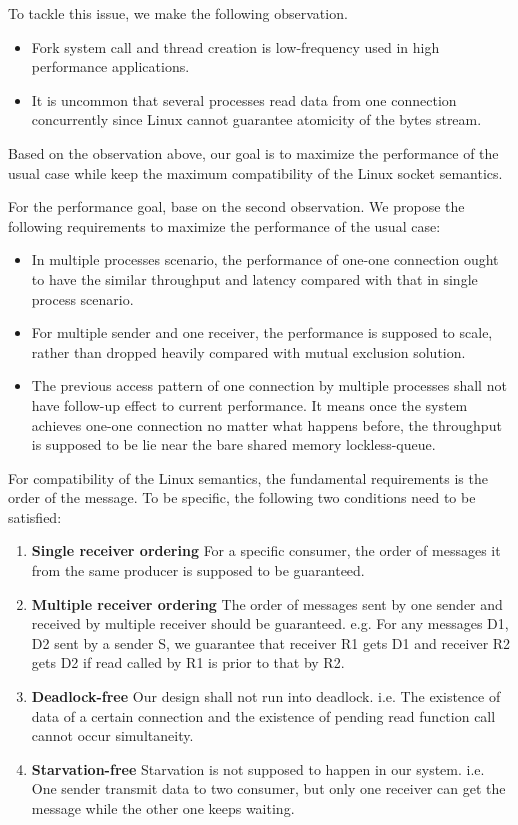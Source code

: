 To tackle this issue, we make the following observation.
\begin{itemize}
	\item Fork system call and thread creation is low-frequency used in high performance applications.
	\item It is uncommon that several processes read data from one connection concurrently since Linux cannot guarantee atomicity of the bytes stream.
\end{itemize} 

Based on the observation above, our goal is to maximize the performance of the usual case while keep the maximum compatibility of the Linux socket semantics.

For the performance goal, base on the second observation. We propose the following requirements to maximize the performance of the usual case:
\begin{itemize}
 \item In multiple processes scenario, the performance of one-one connection ought to have the similar throughput and latency compared with that in single process scenario.
 \item For multiple sender and one receiver, the performance is supposed to scale, rather than dropped heavily compared with mutual exclusion solution.
 \item The previous access pattern of one connection by multiple processes shall not have follow-up effect to current performance. It means once the system achieves one-one connection no matter what happens before, the throughput is supposed to be lie near the bare shared memory lockless-queue.
\end{itemize}

For compatibility of the Linux semantics, the fundamental requirements is the order of the message. To be specific, the following two conditions need to be satisfied:
\begin{enumerate}
\item \textbf{Single receiver ordering } For a specific consumer, the order of messages it from the same producer is supposed to be guaranteed.
\item \textbf{Multiple receiver ordering }The order of messages sent by one sender and received by multiple receiver should be guaranteed. e.g. For any messages D1, D2 sent by a sender S,  we guarantee that receiver R1 gets D1 and receiver R2 gets D2 if read called by R1 is prior to that by R2. 
\item \textbf{Deadlock-free} Our design shall not run into deadlock. i.e. The existence of data of a certain connection and the existence of pending read function call cannot occur simultaneity.
\item \textbf{Starvation-free} Starvation is not supposed to happen in our system. i.e. One sender transmit data to two consumer, but only one receiver can get the message while the other one keeps waiting.
\end{enumerate}

